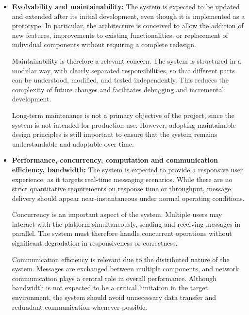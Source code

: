 \documentclass{scrartcl}
\begin{document}
\begin{itemize}
	Openness is considered at a conceptual level. The system is not explicitly designed to interoperate with external third-party services in its current form; however, it is structured in a way that could support future extensions or integration scenarios. The prototype is therefore open to evolution and adaptation, even if full interoperability with external systems is not a primary objective.
	
	\item \textbf{Evolvability and maintainability:} The system is expected to be updated and extended after its initial development, even though it is implemented as a prototype. In particular, the architecture is conceived to allow the addition of new features, improvements to existing functionalities, or replacement of individual components without requiring a complete redesign.
	
	Maintainability is therefore a relevant concern. The system is structured in a modular way, with clearly separated responsibilities, so that different parts can be understood, modified, and tested independently. This reduces the complexity of future changes and facilitates debugging and incremental development.
	
	Long-term maintenance is not a primary objective of the project, since the system is not intended for production use. However, adopting maintainable design principles is still important to ensure that the system remains understandable and adaptable over time.
	
	\item \textbf{Performance, concurrency, computation and communication efficiency, bandwidth:} The system is expected to provide a responsive user experience, as it targets real-time messaging scenarios. While there are no strict quantitative requirements on response time or throughput, message delivery should appear near-instantaneous under normal operating conditions.
	
	Concurrency is an important aspect of the system. Multiple users may interact with the platform simultaneously, sending and receiving messages in parallel. The system must therefore handle concurrent operations without significant degradation in responsiveness or correctness.
	
	Communication efficiency is relevant due to the distributed nature of the system. Messages are exchanged between multiple components, and network communication plays a central role in overall performance. Although bandwidth is not expected to be a critical limitation in the target environment, the system should avoid unnecessary data transfer and redundant communication whenever possible.
	

\end{itemize}
\end{document}
